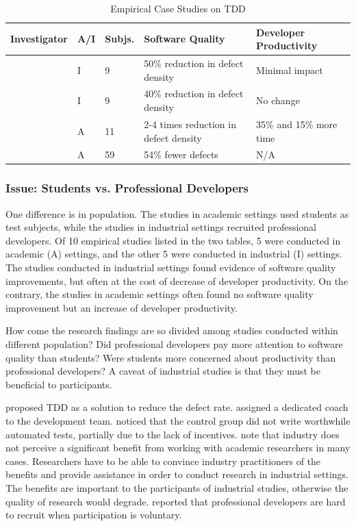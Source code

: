 \documentclass[smallextended]{svjour3}     %
\begin{document}
\begin{table}[ht]
\caption{Empirical Case Studies on TDD}
\begin{tabular}{|l|l|l|p{1.0in}|p{1.0in}|} \hline 
Investigator        & A/I      & Subjs.	& Software Quality	& Developer Productivity \\ \hline
\cite{Maximilien:03}& I &  9	& 50\% reduction in defect density	& Minimal impact \\ \hline
\cite{Williams:03}  & I & 9	& 40\% reduction in defect density	& No change \\ \hline
\cite{Bhat:06}      & A & 11	& 2-4 times reduction in defect density	& 35\% and 15\% more time \\  \hline
\cite{Edwards:04}   & A & 59	& 54\% fewer defects	& N/A \\ \hline
\end{tabular}
\label{tab:CaseStudyTDDResearch}
\end{table}

\subsubsection{Issue: Students vs. Professional Developers}

One difference is in population. The studies in academic settings 
used students as test subjects, while the studies in industrial 
settings recruited professional developers. 
Of 10 empirical studies listed in the two tables, 
5 were conducted in academic (A) settings, and the other 5 were 
conducted in industrial (I) settings. The 
studies conducted in industrial settings found evidence of 
software quality improvements, but often at the cost of 
decrease of developer productivity. On the contrary, the 
studies in academic settings often found no software quality 
improvement but an increase of developer productivity. 

How come the research findings are so divided among studies 
conducted within different population? Did professional 
developers pay more attention to software quality than 
students? Were students more concerned about productivity
than professional developers?  A caveat of industrial studies 
is that they must be beneficial to participants. 

\cite{Maximilien:03} proposed TDD as 
a solution to reduce the defect rate. \cite{Williams:03}
assigned a dedicated coach to the development 
team. \cite{George:03} noticed that the control 
group did not write worthwhile automated tests, partially due to the 
lack of incentives. \cite{Brilliant:99} note 
that industry does not perceive a significant benefit from working 
with academic researchers in many cases. Researchers have to be able
to convince industry practitioners of the benefits and provide 
assistance in order to conduct research in industrial settings. 
The benefits are important to the participants of industrial studies, 
otherwise the quality of research would degrade. \cite{Geras:04}
reported that professional developers are hard to recruit 
when participation is voluntary. 
\end{document}
